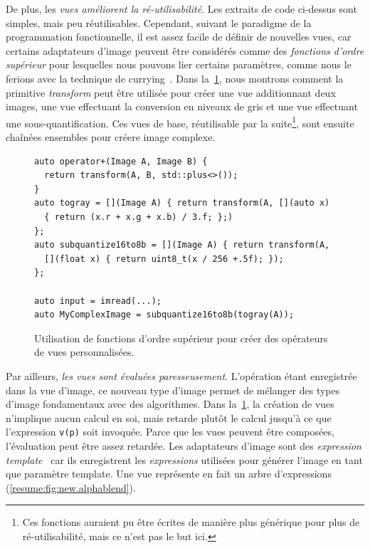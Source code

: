 De plus, les \emph{vues améliorent la ré-utilisabilité}. Les extraits de code ci-dessus sont simples, mais peu
réutilisables. Cependant, suivant le paradigme de la programmation fonctionnelle, il est assez facile de définir de
nouvelles vues, car certains adaptateurs d'image peuvent être considérés comme des \emph{fonctions d'ordre supérieur}
pour lesquelles nous pouvons lier certains paramètres, comme nous le ferions avec la technique de
currying~\parencite{hanus.1995.curry}. Dans la~\cref{resume:fig:view.highorder}, nous montrons comment la primitive
\emph{transform} peut être utilisée pour créer une vue additionnant deux images, une vue effectuant la conversion en
niveaux de gris et une vue effectuant une sous-quantification. Ces vues de base, réutilisable par la suite\footnote{Ces
  fonctions auraient pu être écrites de manière plus générique pour plus de ré-utilisabilité, mais ce n'est pas le but
  ici.}, sont ensuite chaînées ensembles pour créere image complexe.

\begin{figure}
  \begin{verbatim}
auto operator+(Image A, Image B) {
  return transform(A, B, std::plus<>());
}
auto togray = [](Image A) { return transform(A, [](auto x)
  { return (x.r + x.g + x.b) / 3.f; };)
};
auto subquantize16to8b = [](Image A) { return transform(A,
  [](float x) { return uint8_t(x / 256 +.5f); });
};

auto input = imread(...);
auto MyComplexImage = subquantize16to8b(togray(A));
  \end{verbatim}

  \caption[]{Utilisation de fonctions d'ordre supérieur pour créer des opérateurs de vues personnalisées.}
  \label{resume:fig:view.highorder}
\end{figure}

Par ailleurs, \emph{les vues sont évaluées paresseusement}. L'opération étant enregistrée dans la vue d'image, ce
nouveau type d'image permet de mélanger des types d'image fondamentaux avec des algorithmes. Dans
la~\cref{resume:fig:view.highorder}, la création de vues n'implique aucun calcul en soi, mais retarde plutôt le calcul
jusqu'à ce que l'expression \texttt{v(p)} soit invoquée. Parce que les vues peuvent être composées, l'évaluation peut
être assez retardée. Les adaptateurs d'image sont des \emph{expression template}~\parencite{veldhuizen.1995.expression,
  veldhuizen.2000.blitz} car ils enregistrent les \emph{expressions} utilisées pour générer l'image en tant que paramètre
template. Une vue représente en fait un arbre d'expressions (\cref{resume:fig:new.alphablend}).

